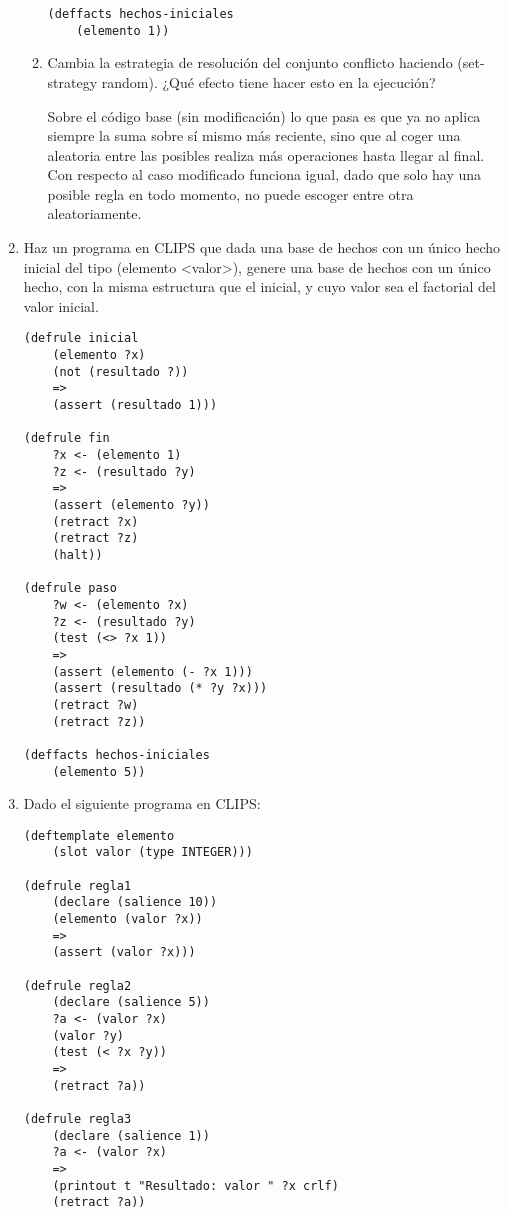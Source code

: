 \documentclass[12pt, spanish, pdftex]{UC3M_document}
\begin{document}
\begin{enumerate}
\begin{enumerate}
\begin{lstlisting}
(deffacts hechos-iniciales
    (elemento 1))
\end{lstlisting}

		      \item Cambia la estrategia de resolución del conjunto conflicto haciendo (set-strategy random). ¿Qué efecto tiene hacer esto en la ejecución?

		            Sobre el código base (sin modificación) lo que pasa es que ya no aplica siempre la suma sobre sí mismo más reciente, sino que al coger una aleatoria entre las posibles realiza más operaciones hasta llegar al final. Con respecto al caso modificado funciona igual, dado que solo hay una posible regla en todo momento, no puede escoger entre otra aleatoriamente.

	      \end{enumerate}
	      \pagebreak

	\item Haz un programa en CLIPS que dada una base de hechos con un único hecho inicial del tipo (elemento <valor>), genere una base de hechos con un único hecho, con la misma estructura que el inicial, y cuyo valor sea el factorial del valor inicial.

	      \begin{lstlisting}
(defrule inicial
    (elemento ?x)
    (not (resultado ?))
    =>
    (assert (resultado 1)))

(defrule fin
    ?x <- (elemento 1)
    ?z <- (resultado ?y)
    =>
    (assert (elemento ?y))
    (retract ?x)
    (retract ?z)
    (halt))

(defrule paso
    ?w <- (elemento ?x)
    ?z <- (resultado ?y)
    (test (<> ?x 1))
    =>
    (assert (elemento (- ?x 1)))
    (assert (resultado (* ?y ?x)))
    (retract ?w)
    (retract ?z))

(deffacts hechos-iniciales
    (elemento 5))
\end{lstlisting}
	      \pagebreak

	\item Dado el siguiente programa en CLIPS:
	      \begin{lstlisting}
(deftemplate elemento
    (slot valor (type INTEGER)))

(defrule regla1
    (declare (salience 10))
    (elemento (valor ?x))
    =>
    (assert (valor ?x)))

(defrule regla2
    (declare (salience 5))
    ?a <- (valor ?x)
    (valor ?y)
    (test (< ?x ?y))
    =>
    (retract ?a))

(defrule regla3
    (declare (salience 1))
    ?a <- (valor ?x)
    =>
    (printout t "Resultado: valor " ?x crlf)
    (retract ?a))


\end{lstlisting}
\end{enumerate}
\end{document}
